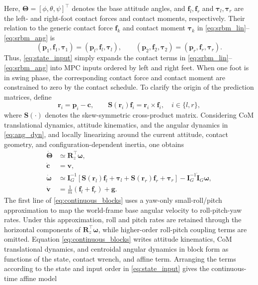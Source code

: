 \documentclass[5p,times]{elsarticle}
\begin{document}
Here, $\bm\Theta=[\phi,\theta,\psi]^\top$ denotes the base attitude angles, and $\bm f_l,\bm f_r$ and $\bm\tau_l,\bm\tau_r$ are the left- and right-foot contact forces and contact moments, respectively. Their relation to the generic contact force $\bm f_k$ and contact moment $\bm\tau_k$ in \eqref{eq:srbm_lin}--\eqref{eq:srbm_ang} is
\begin{equation}
(\bm p_1,\bm f_1,\bm\tau_1)=(\bm p_l,\bm f_l,\bm\tau_l),\qquad
(\bm p_2,\bm f_2,\bm\tau_2)=(\bm p_r,\bm f_r,\bm\tau_r).
\label{eq:contact_lr_mapping}
\end{equation}
Thus, \eqref{eq:state_input} simply expands the contact terms in \eqref{eq:srbm_lin}--\eqref{eq:srbm_ang} into MPC inputs ordered by left and right feet. When one foot is in swing phase, the corresponding contact force and contact moment are constrained to zero by the contact schedule. To clarify the origin of the prediction matrices, define
\begin{equation}
\bm r_i=\bm p_i-\bm c,\qquad
\bm S(\bm r_i)\bm f_i=\bm r_i\times\bm f_i,\quad i\in\{l,r\},
\label{eq:ri_skew}
\end{equation}
where $\bm S(\cdot)$ denotes the skew-symmetric cross-product matrix. Considering CoM translational dynamics, attitude kinematics, and the angular dynamics in \eqref{eq:ang_dyn}, and locally linearizing around the current attitude, contact geometry, and configuration-dependent inertia, one obtains
\begin{equation}
\begin{aligned}
\dot{\bm\Theta}&\simeq \bm R_z^\top\bm\omega,\\
\dot{\bm c}&=\bm v,\\
\dot{\bm\omega}
&\simeq\bm I_G^{-1}\!\left[
\bm S(\bm r_l)\bm f_l+\bm\tau_l
+\bm S(\bm r_r)\bm f_r+\bm\tau_r
\right]
-\bm I_G^{-1}\dot{\bm I}_G\bm\omega,\\
\dot{\bm v}&=\frac{1}{m}(\bm f_l+\bm f_r)+\bm g .
\end{aligned}
\label{eq:continuous_blocks}
\end{equation}
The first line of \eqref{eq:continuous_blocks} uses a yaw-only small-roll/pitch approximation to map the world-frame base angular velocity to roll-pitch-yaw rates. Under this approximation, roll and pitch rates are retained through the horizontal components of $\bm R_z^\top\bm\omega$, while higher-order roll-pitch coupling terms are omitted. Equation \eqref{eq:continuous_blocks} writes attitude kinematics, CoM translational dynamics, and centroidal angular dynamics in block form as functions of the state, contact wrench, and affine term. Arranging the terms according to the state and input order in \eqref{eq:state_input} gives the continuous-time affine model
\end{document}
